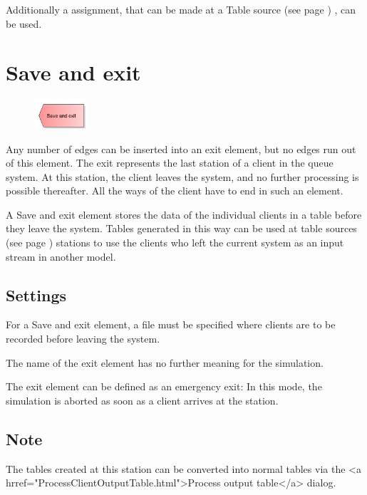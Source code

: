 Additionally a assignment, that can be made at a Table source (see page \pageref{ref:ModelElementSourceTable}) , can be used.


\section{Save and exit}
\label{ref:ModelElementDisposeWithTable}

\begin{figure}
\vspace{-22pt}
\includegraphics[width=2cm]{imageModelElementDisposeWithTable.png}
\vspace{-22pt}
\end{figure}

Any number of edges can be inserted into an exit element, but no edges run out of this element.
The exit represents the last station of a client in the queue system.
At this station, the client leaves the system, and no further processing is possible thereafter.
All the ways of the client have to end in such an element.

A Save and exit element stores the data of the individual clients in a table before they leave the system.
Tables generated in this way can be used at table sources (see page \pageref{ref:ModelElementSourceTable}) stations
to use the clients who left the current system as an input stream in another model.

\subsection*{Settings}

For a Save and exit element, a file must be specified where clients are to be recorded before leaving the system.

The name of the exit element has no further meaning for the simulation.

The exit element can be defined as an emergency exit: In this mode, the simulation is aborted
as soon as a client arrives at the station.

\subsection*{Note}

The tables created at this station can be converted into normal tables via the <a hrref="ProcessClientOutputTable.html">Process output table</a> dialog.



